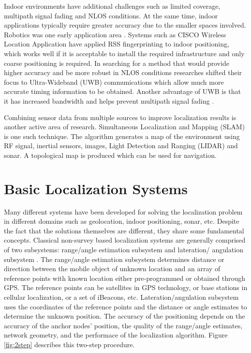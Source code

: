 Indoor environments have additional challenges such as limited coverage, multipath signal fading and NLOS conditions. At the same time, indoor applications typically require greater accuracy due to the smaller spaces involved. Robotics was one early application area \cite{Durant}. Systems such as CISCO Wireless Location Application \cite{CiscoWLA} have applied RSS fingerprinting to indoor positioning, which works well if it is acceptable to install the required infrastructure and only coarse positioning is required. In searching for a method that would provide higher accuracy and be more robust in NLOS conditions researches shifted their focus to Ultra-Wideband (UWB) communications which allow much more accurate timing information to be obtained. Another advantage of UWB is that it has increased bandwidth and helps prevent multipath signal fading \cite{AlaviUWB}.

Combining sensor data from multiple sources to improve localization results is another active area of research. Simultaneous Localization and Mapping (SLAM) is one such technique. The algorithm generates a map of the environment using RF signal, inertial sensors, images, Light Detection and Ranging (LIDAR) and sonar. A topological map is produced which can be used for navigation.



\section{Basic Localization Systems}

Many different systems have been developed for solving the localization problem in different domains such as geolocation, indoor positioning, sonar, etc. Despite the fact that the  solutions themselves are different, they share some fundamental concepts. Classical non-survey based localization systems  are generally comprised of two subsystems: range/angle estimation subsystem and lateration/
angulation subsystem \cite{GeoLoc}. The range/angle estimation subsystem determines distance or direction between the  mobile object of unknown location  and an array of reference points with known location  either pre-programmed or obtained through GPS.  The reference points can be satellites in GPS technology, or base stations in cellular localization, or a set of iBeacons, etc. Lateration/angulation subsystem uses the coordinates of the reference points and the distance or angle estimates to determine the unknown position.  The accuracy of the positioning depends on the accuracy of the anchor nodes’ position, the quality of the range/angle estimates, network geometry, and the performace of the localization algorithm. Figure \ref{fig:2step} describes this two-step procedure.


